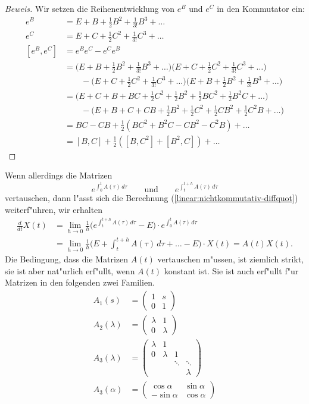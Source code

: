 \begin{proof}[Beweis]
Wir setzen die Reihenentwicklung von $e^B$ und $e^C$ in den Kommutator
ein:
\begin{align*}
e^B
&=
E+B+\frac12B^2+\frac1{3!}B^3+\dots
\\
e^C
&=
E+C+\frac12C^2+\frac1{3!}C^3+\dots
\\
[e^B,e^C]
&=
e^Be^C-e^Ce^B
\\
&=
\biggl(E+B+\frac12B^2+\frac1{3!}B^3+\dots\biggr)
\biggl(E+C+\frac12C^2+\frac1{3!}C^3+\dots\biggr)
\\
&\qquad
-
\biggl(E+C+\frac12C^2+\frac1{3!}C^3+\dots\biggr)
\biggl(E+B+\frac12B^2+\frac1{3!}B^3+\dots\biggr)
\\
&=
\biggl(E+C+B+BC+\frac12C^2+\frac12B^2+\frac12BC^2+\frac12B^2C+\dots\biggr)
\\
&\qquad
-
\biggl(E+B+C+CB+\frac12B^2+\frac12C^2+\frac12CB^2+\frac12C^2B+\dots\biggr)
\\
&=
BC-CB+\frac12(BC^2+B^2C-CB^2-C^2B)+\dots
\\
&=[B,C]+\frac12([B,C^2]+[B^2,C])+\dots
\end{align*}
\end{proof}
Wenn allerdings die Matrizen
\[
e^{\int_0^tA(\tau)\,d\tau}
\qquad\text{und}\qquad
e^{\int_t^{t+h}A(\tau)\,d\tau}
\]
vertauschen, dann l"asst sich die Berechnung
(\ref{linear:nichtkommutativ-diffquot}) weiterf"uhren, wir
erhalten
\begin{align*}
\frac{d}{dt}X(t)
&=
\lim_{h\to 0}\frac1h\biggl(
e^{\int_t^{t+h}A(\tau)\,d\tau}
-
E
\biggr)
\cdot
e^{\int_0^tA(\tau)\,d\tau}
\\
&=
\lim_{h\to0}\frac1h
\biggl(E+\int_t^{t+h}A(\tau)\,d\tau+\dots-E\biggr)\cdot X(t)
=A(t)X(t).
\end{align*}
Die Bedingung, dass die Matrizen $A(t)$ vertauschen m"ussen, ist
ziemlich strikt, sie ist aber nat"urlich erf"ullt, wenn $A(t)$
konstant ist.
Sie ist auch erf"ullt f"ur Matrizen in den folgenden zwei
Familien.
\begin{align*}
A_1(s)&=\begin{pmatrix}1&s\\0&1\end{pmatrix}\\
A_2(\lambda)&=\begin{pmatrix}\lambda&1\\0&\lambda\end{pmatrix}\\
A_3(\lambda)&=\begin{pmatrix}\lambda&      1&      &       \\
                                   0&\lambda&     1&       \\
                                    &       &\ddots&\ddots \\
                                    &       &      &\lambda\end{pmatrix}\\
A_3(\alpha)&=\begin{pmatrix}\cos \alpha&\sin \alpha\\-\sin \alpha&\cos \alpha\end{pmatrix}
\end{align*}
